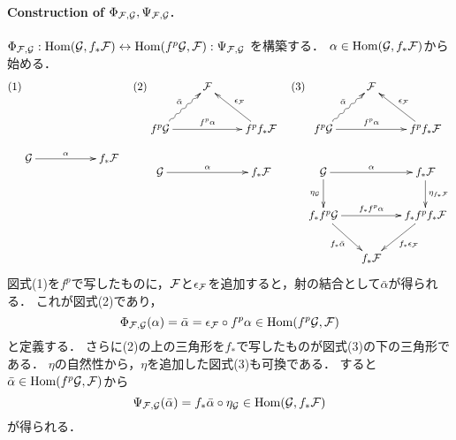 \documentclass[a4paper]{jsarticle}
\begin{document}
    \paragraph{Construction of $\Phi_{\mathcal{F}, \mathcal{G}}, \Psi_{\mathcal{F}, \mathcal{G}}$.}
    $\Phi_{\mathcal{F}, \mathcal{G}}: \operatorname{Hom}(\mathcal{G}, f_* \mathcal{F}) \leftrightarrow \operatorname{Hom}(f^p\mathcal{G}, \mathcal{F}): \Psi_{\mathcal{F}, \mathcal{G}}$
    を構築する．
    $\alpha \in \operatorname{Hom}(\mathcal{G}, f_* \mathcal{F})$から始める．
    \[
        (1)
        \xymatrix
        {
        {} & {} & {} \\
        {} & {} & {} \\
        \shG \ar[rr]^-{\alpha} & {} & f_* \shF \\
        }
        \hspace{1em}
        (2)
        \xymatrix
        {
        {} & \shF  & {} \\
        f^p \shG \ar@{~>}[ru]^-{\bar{\alpha}} \ar[rr]^-{f^p \alpha} & {} & f^p f_* \shF \ar[lu]_-{\epsilon_{\shF}} \\
        \shG \ar[rr]^-{\alpha} & {} & f_* \shF \\
        }
        \hspace{1em}
        (3)
        \xymatrix@C=1.5em
        {
        {} & \shF  & {} \\
        f^p \shG \ar@{~>}[ru]^-{\bar{\alpha}} \ar[rr]^-{f^p \alpha} & {} & f^p f_* \shF \ar[lu]_-{\epsilon_{\shF}} \\
        \shG \ar[rr]^-{\alpha} \ar[d]_-{\eta_{\shG}}& {} & f_* \shF \ar[d]^-{\eta_{f_* \shF}} \\
        f_* f^p \shG \ar[rd]_-{f_* \bar{\alpha}} \ar[rr]^-{f_* f^p \alpha} & {} & f_* f^p f_* \shF \ar[ld]^-{f_* \epsilon_{\shF}} \\
        {} & f_* \shF  & {} \\
        }
    \]
    図式(1)を$f^p$で写したものに，$\mathcal{F}$と$\epsilon_{\mathcal{F}}$を追加すると，射の結合として$\bar{\alpha}$が得られる．
    これが図式(2)であり，
    \[ \Phi_{\mathcal{F}, \mathcal{G}}(\alpha)=\bar{\alpha}=\epsilon_{\mathcal{F}} \circ f^p \alpha \in \operatorname{Hom}(f^p\mathcal{G}, \mathcal{F}) \]
    と定義する．
    さらに(2)の上の三角形を$f_*$で写したものが図式(3)の下の三角形である．
    $\eta$の自然性から，$\eta$を追加した図式(3)も可換である．
    すると$\bar{\alpha} \in \operatorname{Hom}(f^p\mathcal{G}, \mathcal{F})$から
    \[ \Psi_{\mathcal{F}, \mathcal{G}}(\bar{\alpha})=f_* \bar{\alpha} \circ \eta_{\mathcal{G}} \in \operatorname{Hom}(\mathcal{G}, f_* \mathcal{F}) \]が得られる．
\end{document}
